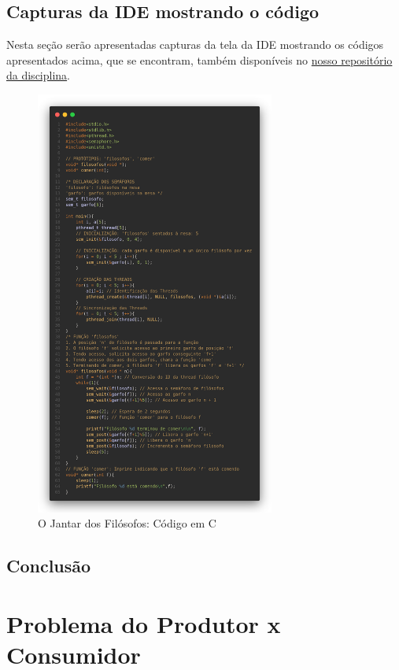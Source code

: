 \documentclass[
	12pt,				%
	openright,			%
	oneside,			%
	a4paper,			%
	chapter=TITLE,		%
	english,			%
	french,				%
	spanish,			%
	brazil				%
	]{abntex2}
\theoremstyle{definition}
\begin{document}
\section{Capturas da IDE mostrando o código}
Nesta seção serão apresentadas capturas da tela da IDE mostrando os códigos apresentados acima, que se encontram, também disponíveis no
\href{https://github.com/jvictorferreira3301/Sistemas_Operacionais}{nosso repositório da disciplina}.
\begin{figure}[h]
    \centering
    \includegraphics[width=0.7\textwidth]{imagens/jantar_filosofos.png}
    \caption{O Jantar dos Filósofos: Código em C}
    \label{fig:jantar_filosofos}
\end{figure}
\clearpage
\section{Conclusão}

\chapter{Problema do Produtor x Consumidor}
\end{document}
